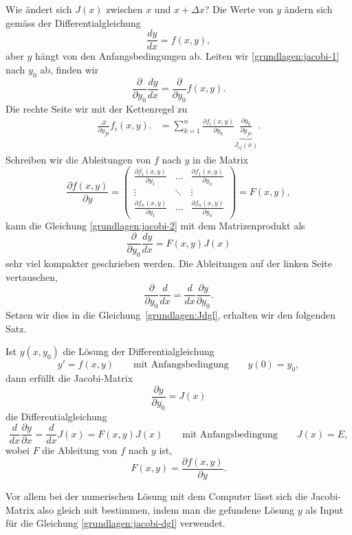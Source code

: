 Wie ändert sich $J(x)$ zwischen $x$ und $x+\Delta x$?
Die Werte von $y$ ändern sich gemäss der Differentialgleichung
\begin{equation}
\frac{dy}{dx}= f(x,y),
\label{grundlagen:jacobi-1}
\end{equation}
aber $y$ hängt von den Anfangsbedingungen ab.
Leiten wir \eqref{grundlagen:jacobi-1} nach $y_0$ ab, finden wir
\begin{equation}
\frac{\partial}{\partial y_0}\frac{dy}{dx}
=
\frac{\partial}{\partial y_0}f(x,y).
\label{grundlagen:jacobi-2}
\end{equation}
Die rechte Seite wir mit der Kettenregel zu
%
\begin{align*}
\frac{\partial}{\partial y_{j0}}f_i(x,y).
&=
\sum_{k=1}^n \frac{\partial f_i(x,y)}{\partial y_{k}}
\underbrace{\frac{\partial y_k}{\partial y_{j0}}}_{\displaystyle J_{ij}(x)}.
\end{align*}
Schreiben wir die Ableitungen von $f$ nach $y$ in die Matrix
\begin{equation}
\frac{\partial f(x,y)}{\partial y}
=
\begin{pmatrix}
\displaystyle\frac{\partial f_1(x,y)}{\partial y_1}&\dots&
	\displaystyle\frac{\partial f_1(x,y)}{\partial y_n}\\
\vdots&\ddots&\vdots\\
\displaystyle\frac{\partial f_n(x,y)}{\partial y_1}&\dots&
	\displaystyle\frac{\partial f_n(x,y)}{\partial y_n}
\end{pmatrix}
=F(x,y),
\label{grundlagen:Jdgl}
\end{equation}
kann die Gleichung \eqref{grundlagen:jacobi-2} mit dem Matrizenprodukt als
%
\begin{equation*}
\frac{\partial}{\partial y_0}\frac{dy}{dx}
=
F(x,y)J(x)
\end{equation*}
sehr viel kompakter geschrieben werden.
Die Ableitungen auf der linken Seite vertauschen,
\[
\frac{\partial}{\partial y_0} \frac{d}{dx}
=
\frac{d}{dx}\frac{\partial y}{\partial y_0}.
\]
Setzen wir dies in die Gleichung~\eqref{grundlagen:Jdgl}, erhalten wir
den folgenden Satz.

\begin{satz}
Ist $y(x,y_0)$ die Lösung der Differentialgleichung 
\[
y'=f(x,y)\qquad\text{mit Anfangsbedingung}\qquad y(0)=y_0,
\]
dann erfüllt die Jacobi-Matrix 
\[
\frac{\partial y}{\partial y_0}=J(x)
\]
die Differentialgleichung
\begin{equation}
\frac{d}{dx}\frac{\partial y}{\partial x}
=
\frac{d}{dx}J(x)
=
F(x,y)J(x)
\qquad
\text{mit Anfangsbedingung}
\qquad
J(x)=E,
\label{grundlagen:jacobi-dgl}
\end{equation}
wobei $F$ die Ableitung von $f$ nach $y$ ist,
\[
F(x,y)=\frac{\partial f(x,y)}{\partial y}.
\]
\end{satz}
Vor allem bei der numerischen Lösung mit dem Computer lässt sich
die Jacobi-Matrix also gleich mit bestimmen, indem man die gefundene
Lösung $y$ als Input für die Gleichung \eqref{grundlagen:jacobi-dgl}
verwendet.

